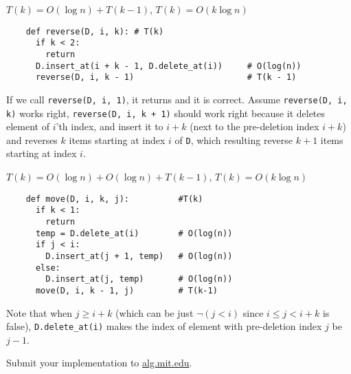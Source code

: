 \documentclass[12pt,twoside]{article}
\begin{document}
\begin{problems}
\begin{problemparts}
\end{problemparts}

\newpage
\problem  %

\begin{problemparts}
  \problempart %
  $T(k) = O(\log n) + T(k - 1)$, $T(k) = O(k\log n)$
  \begin{lstlisting}
    def reverse(D, i, k): # T(k)
      if k < 2:
        return
      D.insert_at(i + k - 1, D.delete_at(i))     # O(log(n))
      reverse(D, i, k - 1)                       # T(k - 1)
  \end{lstlisting}
  If we call \texttt{reverse(D, i, 1)}, it returns and it is correct.
  Assume \texttt{reverse(D, i, k)} works right, \texttt{reverse(D, i,
    k + 1)} should work right because it deletes element of $i$'th
  index, and insert it to $i + k$ (next to the pre-deletion index
  $i + k$) and reverses $k$ items starting at index $i$ of \texttt{D},
  which resulting reverse $k+1$ items starting at index $i$.
  
  \problempart %
  $T(k) = O(\log n) + O(\log n) + T(k-1)$, $T(k) = O(k\log n)$
  
  \begin{lstlisting}
    def move(D, i, k, j):          #T(k)
      if k < 1:
        return
      temp = D.delete_at(i)        # O(log(n))
      if j < i:
        D.insert_at(j + 1, temp)   # O(log(n))
      else:
        D.insert_at(j, temp)       # O(log(n))
      move(D, i, k - 1, j)         # T(k-1)
  \end{lstlisting}
    
  Note that when $j\geq i + k$ (which can be just $\neg(j < i)$ since
  $i\leq j < i+k$ is false), \texttt{D.delete\_at(i)} makes
  the index of element with pre-deletion index $j$ be $j-1$.
  
\end{problemparts}

\newpage
\problem  %


\newpage
\problem  %

\begin{problemparts}
\problempart %
\problempart %
\problempart %
\problempart Submit your implementation to {\small\url{alg.mit.edu}}.
\end{problemparts}

\end{problems}
\end{document}

